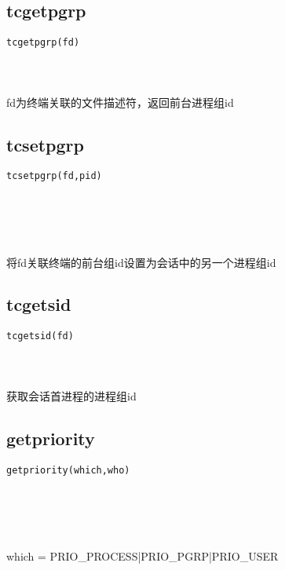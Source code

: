 \documentclass[10pt,a4paper]{article}
\begin{document}
\subsection{tcgetpgrp}
\begin{spacing}{2.0}
\lstset{language=C,numbers=none}
\begin{lstlisting}
tcgetpgrp(fd)
\end{lstlisting}
{\large\color[rgb]{0.2,0.4,0.6}{fd:}}
\paragraph{ \ \ }fd为终端关联的文件描述符，返回前台进程组id
\end{spacing}

\subsection{tcsetpgrp}
\begin{spacing}{2.0}
\lstset{language=C,numbers=none}
\begin{lstlisting}
tcsetpgrp(fd,pid)
\end{lstlisting}
{\large\color[rgb]{0.2,0.4,0.6}{fd:}} \\
{\large\color[rgb]{0.2,0.4,0.6}{pid:}}
\paragraph{ \ \ }将fd关联终端的前台组id设置为会话中的另一个进程组id
\end{spacing}

\subsection{tcgetsid}
\begin{spacing}{2.0}
\lstset{language=C,numbers=none}
\begin{lstlisting}
tcgetsid(fd)
\end{lstlisting}
{\large\color[rgb]{0.2,0.4,0.6}{fd:}}
\paragraph{ \ \ }获取会话首进程的进程组id
\end{spacing}

\subsection{getpriority}
\begin{spacing}{2.0}
\lstset{language=C,numbers=none}
\begin{lstlisting}
getpriority(which,who)
\end{lstlisting}
{\large\color[rgb]{0.2,0.4,0.6}{which:}} \\
{\large\color[rgb]{0.2,0.4,0.6}{who:}}
\paragraph{ \ \ }which = PRIO\_PROCESS|PRIO\_PGRP|PRIO\_USER
\end{spacing}
\end{document}
